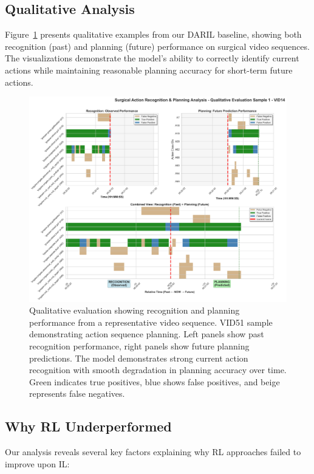 \documentclass[runningheads]{llncs}
\begin{document}
\subsection{Qualitative Analysis}

Figure~\ref{fig:qualitative_examples} presents qualitative examples from our DARIL baseline, showing both recognition (past) and planning (future) performance on surgical video sequences. The visualizations demonstrate the model's ability to correctly identify current actions while maintaining reasonable planning accuracy for short-term future actions.

\begin{figure}[h]
\centering
\includegraphics[width=\textwidth]{VID14_preds_sample_1.png}
\caption{Qualitative evaluation showing recognition and planning performance from a representative video sequence. VID51 sample demonstrating action sequence planning. Left panels show past recognition performance, right panels show future planning predictions. The model demonstrates strong current action recognition with smooth degradation in planning accuracy over time. Green indicates true positives, blue shows false positives, and beige represents false negatives.}
\label{fig:qualitative_examples}
\end{figure}

\subsection{Why RL Underperformed}

Our analysis reveals several key factors explaining why RL approaches failed to improve upon IL:
\end{document}

